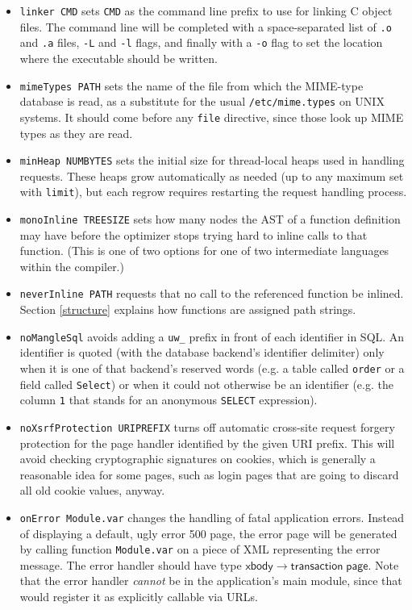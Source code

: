 \documentclass{article}
\newcommand{\mt}[1]{\mathsf{#1}}
\begin{document}
\begin{itemize}
\item \texttt{linker CMD} sets \texttt{CMD} as the command line prefix to use for linking C object files.  The command line will be completed with a space-separated list of \texttt{.o} and \texttt{.a} files, \texttt{-L} and \texttt{-l} flags, and finally with a \texttt{-o} flag to set the location where the executable should be written.
\item \texttt{mimeTypes PATH} sets the name of the file from which the MIME-type database is read, as a substitute for the usual \texttt{/etc/mime.types} on UNIX systems.  It should come before any \texttt{file} directive, since those look up MIME types as they are read.
\item \texttt{minHeap NUMBYTES} sets the initial size for thread-local heaps used in handling requests.  These heaps grow automatically as needed (up to any maximum set with \texttt{limit}), but each regrow requires restarting the request handling process.
\item \texttt{monoInline TREESIZE} sets how many nodes the AST of a function definition may have before the optimizer stops trying hard to inline calls to that function.  (This is one of two options for one of two intermediate languages within the compiler.)
\item \texttt{neverInline PATH} requests that no call to the referenced function be inlined.  Section \ref{structure} explains how functions are assigned path strings.
\item \texttt{noMangleSql} avoids adding a \texttt{uw\_} prefix in front of each identifier in SQL.  An identifier is quoted (with the database backend's identifier delimiter) only when it is one of that backend's reserved words (e.g. a table called \texttt{order} or a field called \texttt{Select}) or when it could not otherwise be an identifier (e.g. the column \texttt{1} that stands for an anonymous \texttt{SELECT} expression).
\item \texttt{noXsrfProtection URIPREFIX} turns off automatic cross-site request forgery protection for the page handler identified by the given URI prefix.  This will avoid checking cryptographic signatures on cookies, which is generally a reasonable idea for some pages, such as login pages that are going to discard all old cookie values, anyway.
\item \texttt{onError Module.var} changes the handling of fatal application errors.  Instead of displaying a default, ugly error 500 page, the error page will be generated by calling function \texttt{Module.var} on a piece of XML representing the error message.  The error handler should have type $\mt{xbody} \to \mt{transaction} \; \mt{page}$.  Note that the error handler \emph{cannot} be in the application's main module, since that would register it as explicitly callable via URLs.

\end{itemize}
\end{document}
